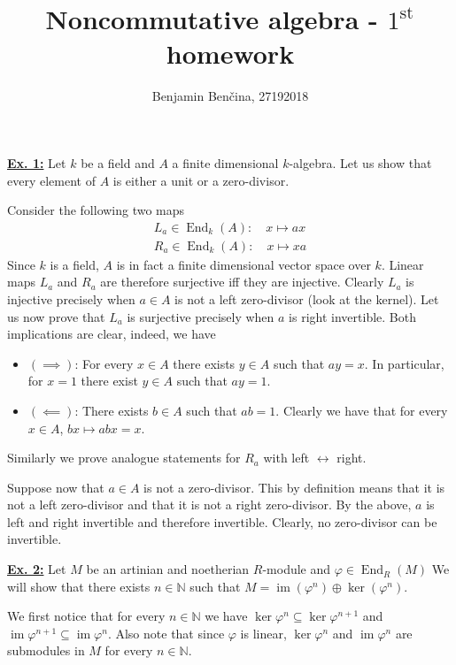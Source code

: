 \documentclass[a4paper, 12pt]{article}
\title{Noncommutative algebra - $1^{\text{st}}$ homework}
\author{Benjamin Benčina, 27192018}
\DeclareMathOperator{\im}{im}
\DeclareMathOperator{\End}{End}
\newcommand{\N}{\mathbb{N}}
\newcommand{\idtfy}{\longleftrightarrow}
\begin{document}
\maketitle

\underline{\textbf{Ex. 1:}}
Let $k$ be a field and $A$ a finite dimensional $k$-algebra. Let us show that every element of $A$ is either a unit or a zero-divisor.

Consider the following two maps
\begin{align*}
L_a \in \End_k(A): \quad x \mapsto ax \\
R_a \in \End_k(A): \quad x \mapsto xa
\end{align*}
Since $k$ is a field, $A$ is in fact a finite dimensional vector space over $k$. Linear maps $L_a$ and $R_a$ are therefore surjective iff they are injective. Clearly $L_a$ is injective precisely when $a \in A$ is not a left zero-divisor (look at the kernel). Let us now prove that $L_a$ is surjective precisely when $a$ is right invertible. Both implications are clear, indeed, we have
\begin{itemize}
	\item $(\implies)$: For every $x \in A$ there exists $y \in A$ such that $ay = x$. In particular, for $x = 1$ there exist $y \in A$ such that $ay = 1$.
	\item $(\impliedby)$: There exists $b \in A$ such that $ab = 1$. Clearly we have that for every $x \in A$, $bx \mapsto abx = x$.
\end{itemize}
Similarly we prove analogue statements for $R_a$ with left $\idtfy$ right.

Suppose now that $a \in A$ is not a zero-divisor. This by definition means that it is not a left zero-divisor and that it is not a right zero-divisor. By the above, $a$ is left and right invertible and therefore invertible. Clearly, no zero-divisor can be invertible.
\newline

\underline{\textbf{Ex. 2:}}
Let $M$ be an artinian and noetherian $R$-module and $\varphi \in \End_R(M)$ We will show that there exists $n \in \N$ such that $M = \im(\varphi^n) \oplus \ker(\varphi^n)$.

We first notice that for every $n \in \N$ we have $\ker\varphi^n \subseteq \ker\varphi^{n+1}$ and $\im\varphi^{n+1} \subseteq \im\varphi^n$. Also note that since $\varphi$ is linear, $\ker\varphi^n$ and $\im\varphi^n$ are submodules in $M$ for every $n \in \N$.
\end{document}
